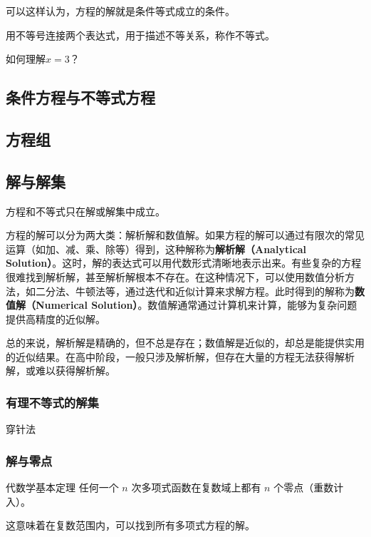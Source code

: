 可以这样认为，方程的解就是条件等式成立的条件。







用不等号连接两个表达式，用于描述不等关系，称作不等式。%

如何理解$x=3$？

\subsection{条件方程与不等式方程}


\subsection{方程组}

\subsection{解与解集}

方程和不等式只在解或解集中成立。

方程的解可以分为两大类：解析解和数值解。如果方程的解可以通过有限次的常见运算（如加、减、乘、除等）得到，这种解称为\textbf{解析解（Analytical Solution）}。这时，解的表达式可以用代数形式清晰地表示出来。有些复杂的方程很难找到解析解，甚至解析解根本不存在。在这种情况下，可以使用数值分析方法，如二分法、牛顿法等，通过迭代和近似计算来求解方程。此时得到的解称为\textbf{数值解（Numerical Solution）}。数值解通常通过计算机来计算，能够为复杂问题提供高精度的近似解。

总的来说，解析解是精确的，但不总是存在；数值解是近似的，却总是能提供实用的近似结果。在高中阶段，一般只涉及解析解，但存在大量的方程无法获得解析解，或难以获得解析解。

\subsubsection{有理不等式的解集}

穿针法

\subsubsection{解与零点}

\begin{definition}{代数学基本定理}
任何一个 $n$ 次多项式函数在复数域上都有 $n$ 个零点（重数计入）。
\end{definition}
这意味着在复数范围内，可以找到所有多项式方程的解。



